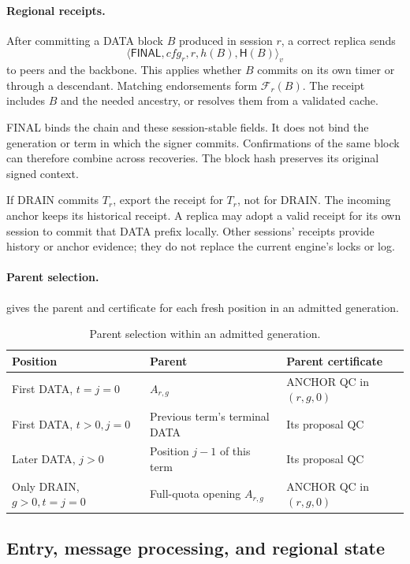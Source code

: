 \documentclass[11pt,a4paper]{article}
\newcommand{\FC}{\mathcal F}
\newcommand{\Hash}{\mathsf H}
\newcommand{\tagg}[1]{\ensuremath{\mathsf{#1}}}
\begin{document}
\paragraph{Regional receipts.}
After committing a DATA block $B$ produced in session $r$, a correct
replica sends
\[
 \langle\tagg{FINAL},\mathit{cfg}_r,r,h(B),\Hash(B)\rangle_v
\]
to peers and the backbone. This applies whether $B$ commits on its own
timer or through a descendant. Matching endorsements form $\FC_r(B)$.
The receipt includes $B$ and the needed ancestry, or resolves them
from a validated cache.

FINAL binds the chain and these session-stable fields.
It does not bind the generation or term in which the signer commits.
Confirmations of the same block can therefore combine across recoveries.
The block hash preserves its original signed context.

If DRAIN commits $T_r$, export the receipt for $T_r$, not for DRAIN.
The incoming anchor keeps its historical receipt.
A replica may adopt a valid receipt for its own session to commit that
DATA prefix locally. Other sessions' receipts provide history or anchor
evidence; they do not replace the current engine's locks or log.

\paragraph{Parent selection.}
 gives the parent and certificate for each fresh position
in an admitted generation.

\begin{table}[htbp]\centering\small
\caption{Parent selection within an admitted generation.}
\label{tab:parent}
\begin{tabularx}{\linewidth}{@{}p{.32\linewidth}Y Y@{}}\toprule
Position & Parent & Parent certificate\\\midrule
First DATA, $t=j=0$ & $A_{r,g}$ & ANCHOR QC in $(r,g,0)$\\
First DATA, $t>0,j=0$ & Previous term's terminal DATA & Its proposal QC\\
Later DATA, $j>0$ & Position $j-1$ of this term & Its proposal QC\\
Only DRAIN, $g>0,t=j=0$ & Full-quota opening $A_{r,g}$ & ANCHOR QC in $(r,g,0)$\\
\bottomrule\end{tabularx}
\end{table}
\FloatBarrier

\subsection{Entry, message processing, and regional state}
\label{sec:admission}
\end{document}
